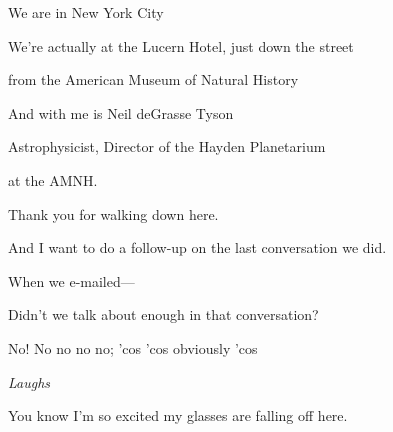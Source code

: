 \documentclass[11pt,a4paper]{article}
\begin{document}
We are in New York City

We’re actually at the Lucern Hotel, just down the street

from the American Museum of Natural History

And with me is Neil deGrasse Tyson

Astrophysicist, Director of the Hayden Planetarium

at the AMNH.

Thank you for walking down here.

And I want to do a follow-up on the last conversation we did.

When we e-mailed—

Didn’t we talk about enough in that conversation?

No! No no no no; 'cos 'cos obviously 'cos

\textit{Laughs}

You know I’m so excited my glasses are falling off here.
\end{document}

